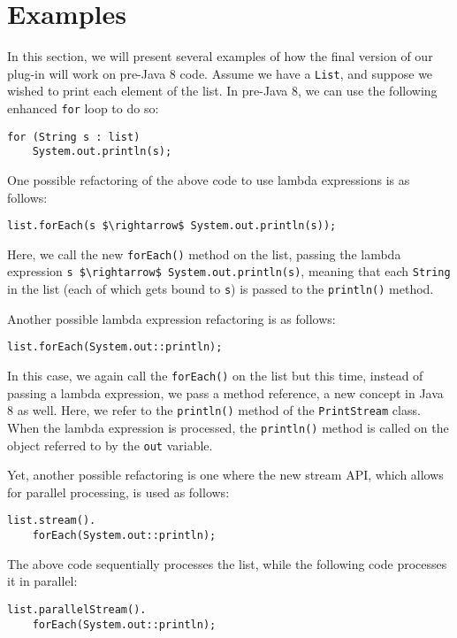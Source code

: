 \section{Examples}

In this section, we will present several examples of how the final version of
our plug-in will work on pre-Java 8 code. Assume we have a \lstinline{List},
and suppose we wished to print each element of the list. In pre-Java 8,
we can use the following enhanced \lstinline{for} loop to do so:

\begin{lstlisting}
for (String s : list) 
    System.out.println(s);  
\end{lstlisting}

One possible refactoring of the above code to use lambda expressions is as follows:
 	
\begin{lstlisting}
list.forEach(s $\rightarrow$ System.out.println(s));  
\end{lstlisting}

Here, we call the new \lstinline{forEach()} method on the list, passing the
lambda expression \lstinline{s $\rightarrow$ System.out.println(s)}, meaning that each
\lstinline{String} in the list (each of which gets bound to \lstinline{s}) is
passed to the \lstinline{println()} method. 

Another possible lambda expression refactoring is as follows:

\begin{lstlisting} 
list.forEach(System.out::println); 
\end{lstlisting}

In this case, we again call the \lstinline{forEach()} on the list but this
time, instead of passing a lambda expression, we pass a method reference, a
new concept in Java 8 as well. Here, we refer to the \lstinline{println()}
method of the \lstinline{PrintStream} class. When the lambda expression is
processed, the \lstinline{println()} method is called on the object referred
to by the \lstinline{out} variable.

Yet, another possible refactoring is one where the new stream API, which
allows for parallel processing, is used as follows:

\begin{lstlisting} 
list.stream().
    forEach(System.out::println);
\end{lstlisting}

The above code sequentially processes the list, while the following code
processes it in parallel:

\begin{lstlisting} 
list.parallelStream().
    forEach(System.out::println);
\end{lstlisting}
